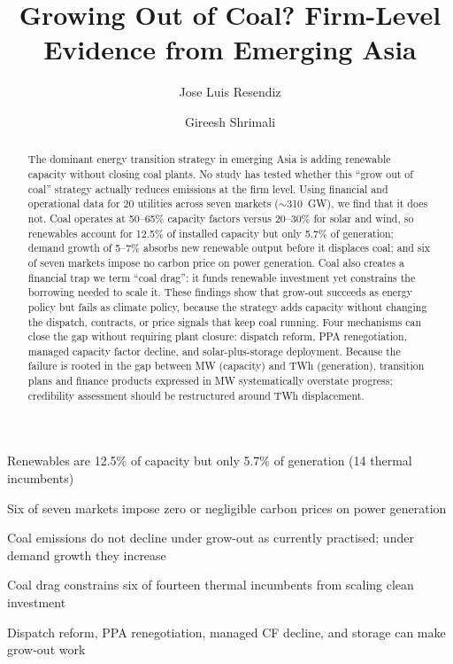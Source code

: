 \documentclass[review,3p,authoryear]{elsarticle}
\begin{document}
\begin{frontmatter}

\begin{highlights}
\item Renewables are 12.5\% of capacity but only 5.7\% of generation (14 thermal incumbents)
\item Six of seven markets impose zero or negligible carbon prices on power generation
\item Coal emissions do not decline under grow-out as currently practised; under demand growth they increase
\item Coal drag constrains six of fourteen thermal incumbents from scaling clean investment
\item Dispatch reform, PPA renegotiation, managed CF decline, and storage can make grow-out work
\end{highlights}

\title{Growing Out of Coal? Firm-Level Evidence from Emerging Asia}

\author[inst1]{Jose Luis Resendiz}

\author[inst1]{Gireesh Shrimali}



\begin{abstract}
The dominant energy transition strategy in emerging Asia is adding renewable capacity without closing coal plants. No study has tested whether this ``grow out of coal'' strategy actually reduces emissions at the firm level. Using financial and operational data for 20 utilities across seven markets ($\sim$310~GW), we find that it does not. Coal operates at 50--65\% capacity factors versus 20--30\% for solar and wind, so renewables account for 12.5\% of installed capacity but only 5.7\% of generation; demand growth of 5--7\% absorbs new renewable output before it displaces coal; and six of seven markets impose no carbon price on power generation. Coal also creates a financial trap we term ``coal drag'': it funds renewable investment yet constrains the borrowing needed to scale it. These findings show that grow-out succeeds as energy policy but fails as climate policy, because the strategy adds capacity without changing the dispatch, contracts, or price signals that keep coal running. Four mechanisms can close the gap without requiring plant closure: dispatch reform, PPA renegotiation, managed capacity factor decline, and solar-plus-storage deployment. Because the failure is rooted in the gap between MW (capacity) and TWh (generation), transition plans and finance products expressed in MW systematically overstate progress; credibility assessment should be restructured around TWh displacement.
\end{abstract}


\end{frontmatter}
\end{document}

